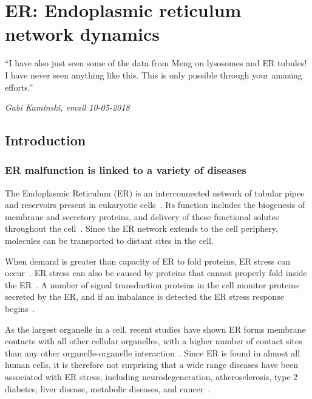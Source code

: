 \chapter{ER: Endoplasmic reticulum network dynamics} \label{chap:ER}



\ifpdf
    \graphicspath{{Chapter5/Figs/Raster/}{Chapter5/Figs/PDF/}{Chapter5/Figs/}}
\else
    \graphicspath{{Chapter5/Figs/Vector/}{Chapter5/Figs/}}
\fi

``I have also just seen some of the data from Meng on lysosomes and ER tubules! I have never seen anything like this. This is only possible through your amazing efforts.''

\textit{Gabi Kaminski, email 10-05-2018}

\section{Introduction} 
\subsection{ER malfunction is linked to a variety of diseases}
The Endoplasmic Reticulum (ER) is an interconnected network of tubular pipes and reservoirs present in eukaryotic cells~\cite{alberts2002molecular}.
Its function includes the biogenesis of membrane and secretory proteins, and delivery of these functional solutes throughout the cell~\cite{dyson1978cell}.
Since the ER network extends to the cell periphery, molecules can be transported to distant sites in the cell.

When demand is greater than capacity of ER to fold proteins, ER stress can occur~\cite{oakes2015role}.
ER stress can also be caused by proteins that cannot properly fold inside the ER~\cite{rao2004misfolded}.
A number of signal transduction proteins in the cell monitor proteins secreted by the ER, and if an imbalance is detected the ER stress response begins~\cite{oakes2015role}.

As the largest organelle in a cell, recent studies have shown ER forms membrane contacts with all other cellular organelles, with a higher number of contact sites than any other organelle-organelle interaction~\cite{phillips2016structure, valm2017applying}. 
Since ER is found in almost all human cells, it is therefore not surprising that a wide range diseases have been associated with ER stress, including neurodegeneration, atherosclerosis, type 2 diabetes, liver disease, metabolic diseases, and cancer~\cite{oakes2015role, ozcan2012role}.

